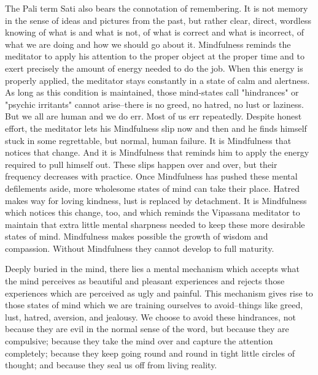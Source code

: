 The Pali term Sati also bears the connotation of remembering. It is not memory
in the sense of ideas and pictures from the past, but rather clear, direct,
wordless knowing of what is and what is not, of what is correct and what is
incorrect, of what we are doing and how we should go about it. Mindfulness
reminds the meditator to apply his attention to the proper object at the proper
time and to exert precisely the amount of energy needed to do the job. When this
energy is properly applied, the meditator stays constantly in a state of calm
and alertness. As long as this condition is maintained, those mind-states call
"hindrances" or "psychic irritants" cannot arise--there is no greed, no hatred,
no lust or laziness. But we all are human and we do err. Most of us err
repeatedly. Despite honest effort, the meditator lets his Mindfulness slip now
and then and he finds himself stuck in some regrettable, but normal, human
failure. It is Mindfulness that notices that change. And it is Mindfulness that
reminds him to apply the energy required to pull himself out. These slips happen
over and over, but their frequency decreases with practice. Once Mindfulness has
pushed these mental defilements aside, more wholesome states of mind can take
their place. Hatred makes way for loving kindness, lust is replaced by
detachment. It is Mindfulness which notices this change, too, and which reminds
the Vipassana meditator to maintain that extra little mental sharpness needed to
keep these more desirable states of mind. Mindfulness makes possible the growth
of wisdom and compassion. Without Mindfulness they cannot develop to full
maturity.

Deeply buried in the mind, there lies a mental mechanism which accepts what the
mind perceives as beautiful and pleasant experiences and rejects those
experiences which are perceived as ugly and painful. This mechanism gives rise
to those states of mind which we are training ourselves to avoid--things like
greed, lust, hatred, aversion, and jealousy. We choose to avoid these
hindrances, not because they are evil in the normal sense of the word, but
because they are compulsive; because they take the mind over and capture the
attention completely; because they keep going round and round in tight little
circles of thought; and because they seal us off from living reality.

